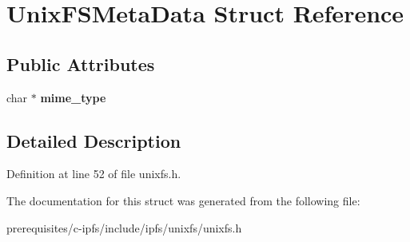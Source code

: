 \hypertarget{struct_unix_f_s_meta_data}{}\section{Unix\+F\+S\+Meta\+Data Struct Reference}
\label{struct_unix_f_s_meta_data}
\subsection*{Public Attributes}
\begin{DoxyCompactItemize}
\item 
\mbox{\label{struct_unix_f_s_meta_data_a4e94fc4e0685f1626d2131e42230dc5a}} 
char $\ast$ {\bfseries mime\+\_\+type}
\end{DoxyCompactItemize}


\subsection{Detailed Description}


Definition at line 52 of file unixfs.\+h.



The documentation for this struct was generated from the following file\+:\begin{DoxyCompactItemize}
\item 
prerequisites/c-\/ipfs/include/ipfs/unixfs/unixfs.\+h\end{DoxyCompactItemize}
